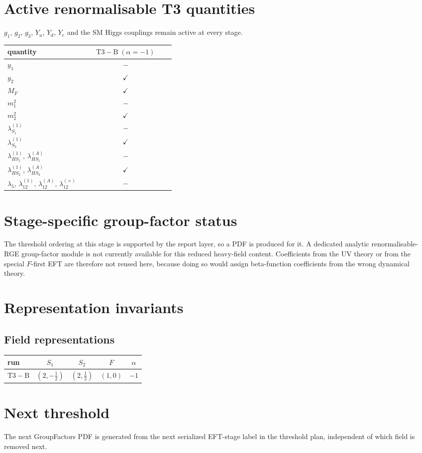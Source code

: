\documentclass[9pt]{article}
\begin{document}
\section*{Active renormalisable T3 quantities}
$g_1$, $g_2$, $g_3$, $Y_u$, $Y_d$, $Y_e$ and the SM Higgs couplings remain active at every stage.
\begin{longtable}{@{}p{0.45\linewidth}c@{}}
\toprule
quantity & $ \mathrm{T3-B}\;(\alpha=-1) $ \\
\midrule
$y_1$ & $-$ \\
$y_2$ & $\checkmark$ \\
$M_F$ & $\checkmark$ \\
$m_1^2$ & $-$ \\
$m_2^2$ & $\checkmark$ \\
$\lambda_{S_1}^{(1)}$ & $-$ \\
$\lambda_{S_2}^{(1)}$ & $\checkmark$ \\
$\lambda_{HS_1}^{(1)},\,\lambda_{HS_1}^{(A)}$ & $-$ \\
$\lambda_{HS_2}^{(1)},\,\lambda_{HS_2}^{(A)}$ & $\checkmark$ \\
$\lambda_5,\,\lambda_{12}^{(1)},\,\lambda_{12}^{(A)},\,\lambda_{12}^{(\times)}$ & $-$ \\
\bottomrule
\end{longtable}
\section*{Stage-specific group-factor status}
The threshold ordering at this stage is supported by the report layer, so a PDF is produced for it.  A dedicated analytic renormalisable-RGE group-factor module is not currently available for this reduced heavy-field content.  Coefficients from the UV theory or from the special $F$-first EFT are therefore not reused here, because doing so would assign beta-function coefficients from the wrong dynamical theory.
\section*{Representation invariants}
\subsection*{Field representations}
\begin{longtable}{@{}lcccc@{}}
\toprule
run & $S_1$ & $S_2$ & $F$ & $\alpha$ \\
\midrule
$\mathrm{T3-B}$ & $(2,- \frac{1}{2})$ & $(2,\frac{1}{2})$ & $(1,0)$ & $-1$ \\
\bottomrule
\end{longtable}
\section*{Next threshold}
The next GroupFactors PDF is generated from the next serialized EFT-stage label in the threshold plan, independent of which field is removed next.
\end{document}
